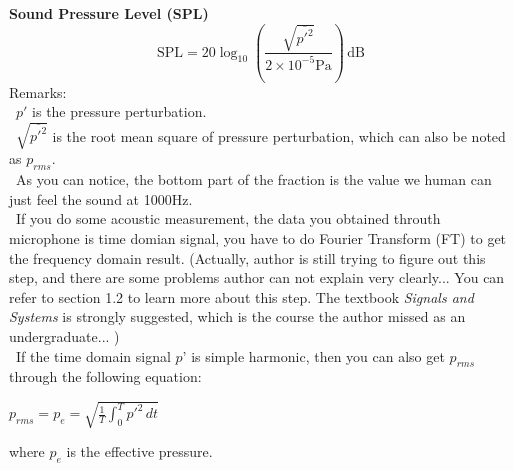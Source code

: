 \documentclass[graybox]{svmult}
\begin{document}
\noindent 
\textbf{Sound Pressure Level (SPL)}
\[
\text{SPL} = 20 \log_{10} \left( \frac{ \sqrt{\overline{p'^2}} }{2 \times 10^{-5} \text{Pa}} \right) \, \text{dB}
\]
Remarks:\\
\textbullet\ $p'$ is the pressure perturbation. \\
\textbullet\ $\sqrt{\overline{p'^2}}  $ is the root mean square of pressure perturbation, which can also be noted as $ p_{rms}$. \\
\textbullet\ As you can notice, the bottom part of the fraction is the value we human can just feel the sound at 1000Hz. \\
\textbullet\ If you do some acoustic measurement, the data you obtained throuth microphone is time domian signal, you have to do Fourier Transform (FT) to get the frequency domain result. (Actually, author is still trying to figure out this step, and there are some problems author can not explain very clearly... You can refer to section 1.2 to learn more about this step. The textbook \textit{Signals and Systems} is strongly suggested, which is the course the author missed as an undergraduate... )\\
\textbullet\ If the time domain signal $ p’ $ is simple harmonic, then you can also get $ p_{rms} $ through the following equation: 
\begin{center}
$ p_{rms} = p_e = \sqrt{\frac{1}{T} \int_{0}^{T}  p'^2\,dt } $
\end{center}
where $ p_e $ is the effective pressure.\\
\end{document}
